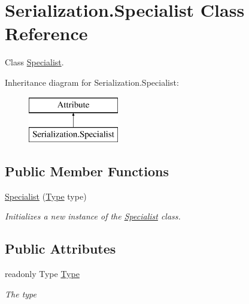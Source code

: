 \hypertarget{class_serialization_1_1_specialist}{}\section{Serialization.\+Specialist Class Reference}
\label{class_serialization_1_1_specialist}


Class \hyperlink{class_serialization_1_1_specialist}{Specialist}.  


Inheritance diagram for Serialization.\+Specialist\+:\begin{figure}[H]
\begin{center}
\leavevmode
\includegraphics[height=2.000000cm]{class_serialization_1_1_specialist}
\end{center}
\end{figure}
\subsection*{Public Member Functions}
\begin{DoxyCompactItemize}
\item 
\hyperlink{class_serialization_1_1_specialist_af1f9433f221cfd4490f5d30f4045e06f}{Specialist} (\hyperlink{class_serialization_1_1_specialist_aa9b0e99569f13034ea86bfb104c79be3}{Type} type)
\begin{DoxyCompactList}\small\item\em Initializes a new instance of the \hyperlink{class_serialization_1_1_specialist}{Specialist} class. \end{DoxyCompactList}\end{DoxyCompactItemize}
\subsection*{Public Attributes}
\begin{DoxyCompactItemize}
\item 
readonly Type \hyperlink{class_serialization_1_1_specialist_aa9b0e99569f13034ea86bfb104c79be3}{Type}
\begin{DoxyCompactList}\small\item\em The type \end{DoxyCompactList}\end{DoxyCompactItemize}


